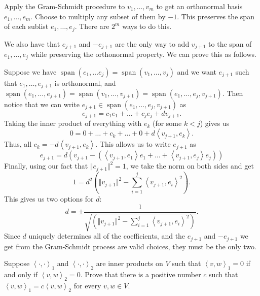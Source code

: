 \documentclass[12pt, letterpaper]{hmcpset}
\begin{document}
\begin{solution}
	Apply the Gram-Schmidt procedure to $v_1, \dots, v_m$ to get an orthonormal basis $e_1, \dots, e_m$. Choose to multiply any subset of them by $-1$. This preserves the span of each sublist $e_1, \dots, e_j$. There are $2^m$ ways to do this.

	We also have that $e_{j + 1}$ and $-e_{j + 1}$ are the only way to add $v_{j + 1}$ to the span of $e_1, \dots, e_j$ while preserving the orthonormal property. We can prove this as follows.

	Suppose we have $\operatorname{span}(e_1, \dots e_j) = \operatorname{span}(v_1, \dots, v_j)$ and we want $e_{j + 1}$ such that $e_1, \dots, e_{j + 1}$ is orthonormal, and $\operatorname{span}(e_1, \dots, e_{j + 1}) = \operatorname{span}(v_1, \dots, v_{j + 1}) = \operatorname{span}(e_1, \dots, e_j, v_{j + 1})$. Then notice that we can write $e_{j + 1} \in \operatorname{span}(e_1, \dots, e_j, v_{j + 1})$ as
	\[
		e_{j + 1} = c_1 e_1 + \dots + c_j e_j + d v_{j + 1}.
	\]
	Taking the inner product of everything with $e_{k}$ (for some $k < j$) gives us
	\[
		0 = 0 + \dots + c_k + \dots + 0 + d \left < v_{j + 1}, e_k \right >.
	\]
	Thus, all $c_k = - d \left < v_{j + 1}, e_k \right >$. This allows us to write $e_{j + 1}$ as
	\[
		e_{j + 1} = d ( v_{j + 1} - ( \left < v_{j + 1}, e_1 \right > e_1 + \dots + \left < v_{j + 1}, e_j \right > e_j ) )
	\]
	Finally, using our fact that $\Vert e_{j + 1} \Vert^2 = 1$, we take the norm on both sides and get
	\[
		1 = d^2 \left ( \Vert v_{j + 1} \Vert^2 - \sum_{i = 1}^j \left < v_{j + 1}, e_i \right >^2 \right ).
	\]
	This gives us two options for $d$:
	\[
		d = \pm \frac{1}{\sqrt{\left ( \Vert v_{j + 1} \Vert^2 - \sum_{i = 1}^j \left < v_{j + 1}, e_i \right >^2 \right )}}.
	\]
	Since $d$ uniquely determines all of the coefficients, and the $e_{j + 1}$ and $- e_{j + 1}$ we get from the Gram-Schmidt process are valid choices, they must be the only two.
\end{solution}

\pagebreak

\begin{problem}[11.]
	Suppose $\left < \cdot, \cdot \right >_1$ and $\left < \cdot, \cdot \right >_2$ are inner products on $V$ such that $\left < v, w \right >_1 = 0$ if and only if $\left < v, w \right >_2 = 0$. Prove that there is a positive number $c$ such that $\left < v, w \right >_1 = c \left < v, w \right >_2$ for every $v, w \in V$.
\end{problem}
\end{document}
